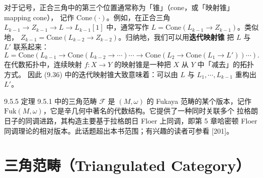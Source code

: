 对于记号，正合三角中的第三个位置通常称为「锥」（cone，或「映射锥」mapping cone），
记作 $\mathrm{Cone}(\cdot)$。例如，在正合三角
$L_{k-1}\to Z_{k-1}\to L\to L_{k-1}[1]$ 中，通常写作
$L=\mathrm{Cone}(L_{k-1}\to Z_{k-1})$。类似地，
$Z_{k-1}=\mathrm{Cone}(L_{k-2}\to Z_{k-2})$。归纳地，我们可以用\textbf{迭代映射锥}
把 $L$ 与 $L'$ 联系起来：
\begin{equation}\tag{9.36}
L=\mathrm{Cone}\left(L_{k-1}\to\mathrm{Cone}(L_{k-2}\to\cdots)\cdots
\to\mathrm{Cone}(L_2\to\mathrm{Cone}(L_1\to L'))\cdots\right).
\end{equation}
在代数拓扑中，连续映射 $f:X\to Y$ 的映射锥是一种把 $X$ 从 $Y$ 中「减去」的拓扑方式。
因此 (9.36) 中的迭代映射锥大致意味着：可以由 $L$ 与 $L_1,\cdots,L_{k-1}$ 重构出
$L'$。

\begin{wrem}{9.5.5}
定理 9.5.1 中的三角范畴 $\mathcal F$ 是 $(M,\omega)$ 的 Fukaya 范畴的某个版本，记作
$\mathrm{Fuk}(M,\omega)$，它是辛几何中著名的代数结构。它提供了一种同时关联多个
拉格朗日子的同调进路，其构造主要基于拉格朗日 Floer 上同调，即第 5 章哈密顿 Floer
同调理论的相对版本。此话题超出本书范围；有兴趣的读者可参看 [201]。
\end{wrem}


\section{三角范畴（Triangulated Category）}


